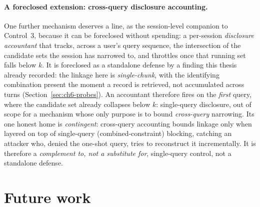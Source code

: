 \documentclass[11pt,a4paper]{report}
\begin{document}
\paragraph{A foreclosed extension: cross-query disclosure accounting.} One further mechanism deserves a
line, as the session-level companion to Control~3, because it can be foreclosed without spending: a
per-session \emph{disclosure accountant} that tracks, across a user's query sequence, the intersection of
the candidate sets the session has narrowed to, and throttles once that running set falls below $k$. It is
foreclosed as a standalone defense by a finding this thesis already recorded: the linkage here is
\emph{single-chunk}, with the identifying combination present the moment a record is retrieved, not
accumulated across turns (Section~\ref{sec:ch6-probes}). An accountant therefore fires on the \emph{first}
query, where the candidate set already collapses below $k$: single-query disclosure, out of scope for a
mechanism whose only purpose is to bound \emph{cross-query} narrowing. Its one honest home is
\emph{contingent}: cross-query accounting bounds linkage only when layered on top of single-query
(combined-constraint) blocking, catching an attacker who, denied the one-shot query, tries to reconstruct
it incrementally. It is therefore a \emph{complement to, not a substitute for}, single-query control, not a
standalone defense.

\section{Future work}
\label{sec:disc-future}
\end{document}
